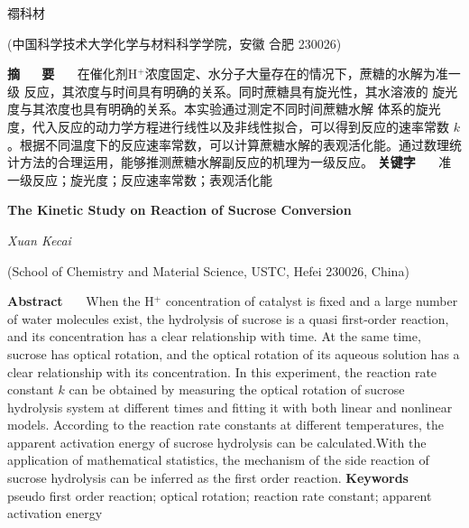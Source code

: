 \documentclass[12pt]{ctexart}
\numberwithin{equation}{section}
\begin{document}
\nocite{*}

\begin{center}
    \heiti {}

    \vspace{12pt}

    \kaishu \fontsize{13.75pt}{0}禤科材
    


    \vspace{5pt}

    \songti \fontsize{12pt}{0}(中国科学技术大学化学与材料科学学院，安徽 合肥 230026)
\end{center}

\noindent\textbf{摘~~~\!要}~~~\!
在催化剂H$^+$浓度固定、水分子大量存在的情况下，蔗糖的水解为准一级
反应，其浓度与时间具有明确的关系。同时蔗糖具有旋光性，其水溶液的
旋光度与其浓度也具有明确的关系。本实验通过测定不同时间蔗糖水解
体系的旋光度，代入反应的动力学方程进行线性以及非线性拟合，可以得到反应的速率常数
$k$。根据不同温度下的反应速率常数，可以计算蔗糖水解的表观活化能。通过数理统计方法的合理运用，能够推测蔗糖水解副反应的机理为一级反应。
\newline
\textbf{关键字}~~~\!
{\kaishu 准一级反应；旋光度；反应速率常数；表观活化能}

\begin{center}
    {\LARGE\rmfamily\textbf{The Kinetic Study on Reaction of Sucrose Conversion}}

    \vspace{12pt}

    {\slshape Xuan Kecai}

    \vspace{5pt}

    (School of Chemistry and Material Science, USTC, Hefei 230026, China)
\end{center}

\noindent\textbf{Abstract}~~~\!
When the H$^+$ concentration of catalyst is fixed and a large
number of water molecules exist, the hydrolysis of sucrose is
a quasi first-order reaction, and its concentration has a
clear relationship with time. At the same time, sucrose has
optical rotation, and the optical rotation of its aqueous
solution has a clear relationship with its concentration. In
this experiment, the reaction rate constant $k$ can be
obtained by measuring the optical rotation of sucrose
hydrolysis system at different times and fitting it with both linear and nonlinear models. According to the reaction
rate constants at different temperatures, the apparent
activation energy of sucrose hydrolysis can be calculated.With the application of mathematical statistics, the mechanism of the side reaction of sucrose hydrolysis can be inferred as the first order reaction.
\newline
\textbf{Keywords}~~~\!
pseudo first order reaction; optical rotation;
reaction rate constant; apparent activation energy
\end{document}
